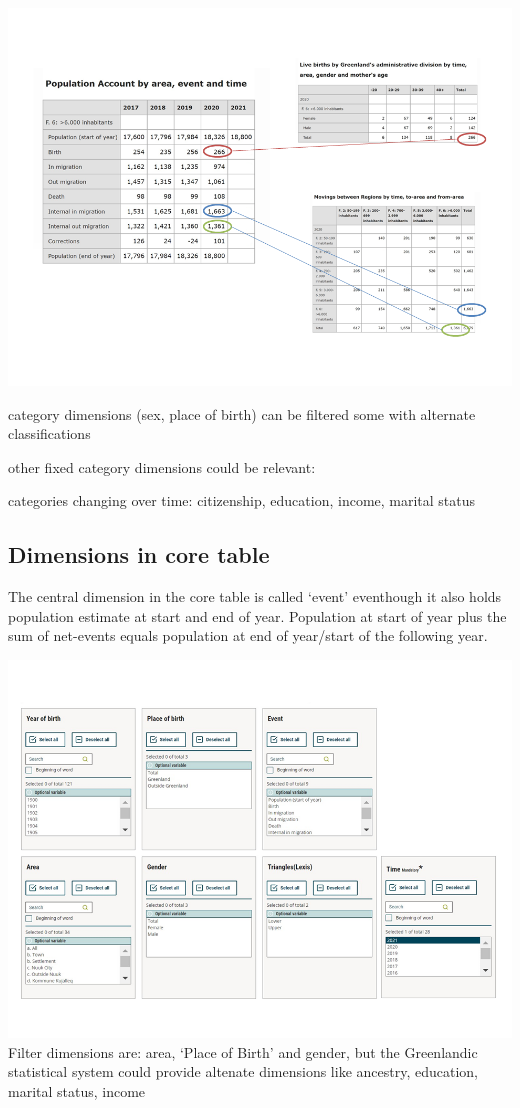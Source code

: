 \documentclass[USenglish]{article}
\begin{document}
\includegraphics[scale=0.4]{images/PopulationAccountCoreSatellite}

category dimensions (sex, place of birth) can be filtered some with alternate classifications

other fixed category dimensions could be relevant: 

categories changing over time:
citizenship, education, income, marital status


\subsection{Dimensions in core table} 
The central dimension in the core table is called ‘event’ eventhough it also holds population estimate at start and end of year. Population at start of year plus the sum of net-events equals population at end of year/start of the following year.

\includegraphics[scale=0.4]{images/PopulationAccountCore}
Filter dimensions are: area, ‘Place of Birth’ and gender, but the Greenlandic statistical system could provide altenate dimensions like ancestry, education, marital status, income
\end{document}
